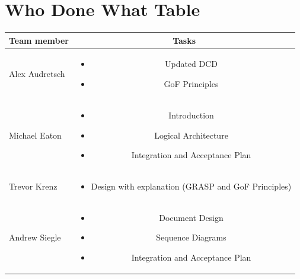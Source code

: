 \documentclass{article}
\begin{document}
\newpage
\section{Who Done What Table}
\begin{center}
\begin{tabular}{|l|c|}
\hline
Team member & Tasks \\ \hline
Alex Audretsch & 
\begin{minipage}{.4\textwidth}
\vspace{11pt}
\begin{itemize}
	\item Updated DCD
	\item GoF Principles
\end{itemize} 
\end{minipage} \\ \hline
Michael Eaton & 
\begin{minipage}{.4\textwidth}
\vspace{11pt}
\begin{itemize}
	\item Introduction
	\item Logical Architecture
	\item Integration and Acceptance Plan
\end{itemize} 
\end{minipage} \\ \hline
Trevor Krenz & 
\begin{minipage}{.4\textwidth}
\vspace{11pt}
\begin{itemize}
	\item Design with explanation (GRASP and GoF Principles)
\end{itemize} 
\end{minipage} \\ \hline
Andrew Siegle & 
\begin{minipage}{.4\textwidth}
\vspace{11pt}
\begin{itemize}
	\item Document Design
	\item Sequence Diagrams
	\item Integration and Acceptance Plan
\end{itemize} 
\end{minipage} \\ \hline
\end{tabular}
\end{center}
\end{document}
